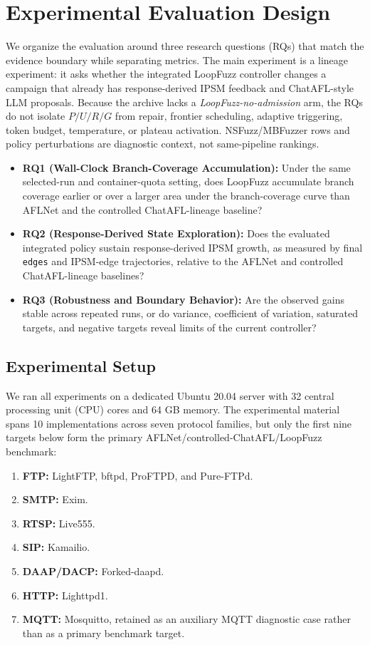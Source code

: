 \documentclass[final,5p,times,number]{elsarticle}
\begin{document}
\section{Experimental Evaluation Design}

We organize the evaluation around three research questions (RQs) that match the evidence boundary while separating metrics. The main experiment is a lineage experiment: it asks whether the integrated LoopFuzz controller changes a campaign that already has response-derived IPSM feedback and ChatAFL-style LLM proposals. Because the archive lacks a \emph{LoopFuzz-no-admission} arm, the RQs do not isolate $P/U/R/G$ from repair, frontier scheduling, adaptive triggering, token budget, temperature, or plateau activation. NSFuzz/MBFuzzer rows and policy perturbations are diagnostic context, not same-pipeline rankings.
\begin{itemize}
    \item \textbf{RQ1 (Wall-Clock Branch-Coverage Accumulation):} Under the same selected-run and container-quota setting, does LoopFuzz accumulate branch coverage earlier or over a larger area under the branch-coverage curve than AFLNet and the controlled ChatAFL-lineage baseline?
    \item \textbf{RQ2 (Response-Derived State Exploration):} Does the evaluated integrated policy sustain response-derived IPSM growth, as measured by final \texttt{edges} and IPSM-edge trajectories, relative to the AFLNet and controlled ChatAFL-lineage baselines?
    \item \textbf{RQ3 (Robustness and Boundary Behavior):} Are the observed gains stable across repeated runs, or do variance, coefficient of variation, saturated targets, and negative targets reveal limits of the current controller?
\end{itemize}

\subsection{Experimental Setup}
We ran all experiments on a dedicated Ubuntu 20.04 server with 32 central processing unit (CPU) cores and 64 GB memory. The experimental material spans 10 implementations across seven protocol families, but only the first nine targets below form the primary AFLNet/controlled-ChatAFL/LoopFuzz benchmark:
\begin{enumerate}
    \item \textbf{FTP:} LightFTP, bftpd, ProFTPD, and Pure-FTPd.
    \item \textbf{SMTP:} Exim.
    \item \textbf{RTSP:} Live555.
    \item \textbf{SIP:} Kamailio.
    \item \textbf{DAAP/DACP:} Forked-daapd.
    \item \textbf{HTTP:} Lighttpd1.
    \item \textbf{MQTT:} Mosquitto, retained as an auxiliary MQTT diagnostic case rather than as a primary benchmark target.
\end{enumerate}
\end{document}
